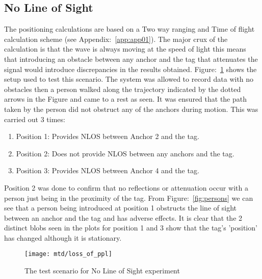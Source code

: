 \subsection{No Line of Sight}\label{subsec:no-line-of-sight}
The positioning calculations are based on a Two way ranging and Time of flight calculation scheme (see Appendix:~\ref{app:app01}).
The major crux of the calculation is that the wave is always moving at the speed of light this means that introducing an obstacle between any anchor and the tag that attenuates the signal would introduce discrepancies in the results obtained.
Figure:~\ref{fig:nlos} shows the setup used to test this scenario.
The system was allowed to record data with no obstacles then a person walked along the trajectory indicated by the dotted arrows in the Figure and came to a rest as seen.
It was ensured that the path taken by the person did not obstruct any of the anchors during motion.
This was carried out 3 times:
\begin{enumerate}
    \item Position 1: Provides NLOS between Anchor 2 and the tag.
    \item Position 2: Does not provide NLOS between any anchors and the tag.
    \item Position 3: Provides NLOS between Anchor 4 and the tag.
\end{enumerate}
Position 2 was done to confirm that no reflections or attenuation occur with a person just being in the proximity of the tag.
From Figure:~\ref{fig:persons} we can see that a person being introduced at position 1 obstructs the line of sight between an anchor and the tag and has adverse effects.
It is clear that the 2 distinct blobs seen in the plots for position 1 and 3 show that the tag's 'position' has changed although it is stationary.

\begin{figure}[h!]
    \centering
    \texttt{[image: mtd/loss\_of\_ppl]}
    \caption{The test scenario for No Line of Sight experiment}
    \label{fig:nlos}
\end{figure}

